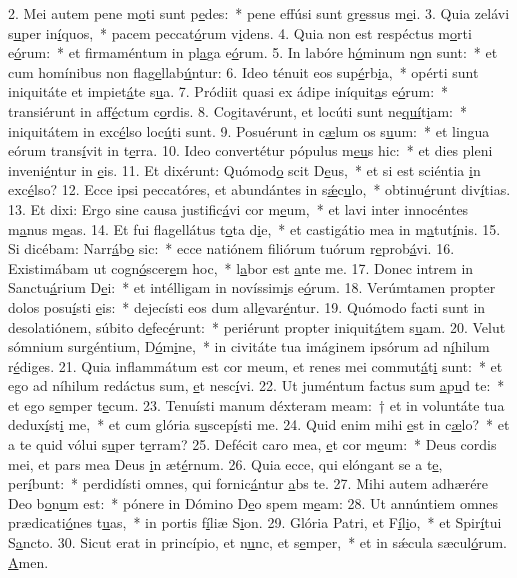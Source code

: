 2. Mei autem pene m\uline{o}ti sunt p\uline{e}des:~* pene effúsi sunt gr\uline{e}ssus m\uline{e}i.
3. Quia zelávi s\uline{u}per in\uline{í}quos,~* pacem peccat\uline{ó}rum v\uline{i}dens.
4. Quia non est respéctus m\uline{o}rti e\uline{ó}rum:~* et firmaméntum in pl\uline{a}ga e\uline{ó}rum.
5. In labóre h\uline{ó}minum n\uline{o}n sunt:~* et cum homínibus non flag\uline{e}llab\uline{ú}ntur:
6. Ideo ténuit eos sup\uline{é}rb\uline{i}a,~* opérti sunt iniquitáte et impiet\uline{á}te s\uline{u}a.
7. Pródiit quasi ex ádipe iníquit\uline{a}s e\uline{ó}rum:~* transiérunt in aff\uline{é}ctum c\uline{o}rdis.
8. Cogitavérunt, et locúti sunt ne\uline{quí}t\uline{i}am:~* iniquitátem in exc\uline{é}lso loc\uline{ú}ti sunt.
9. Posuérunt in c\uline{æ}lum os s\uline{u}um:~* et lingua eórum trans\uline{í}vit in t\uline{e}rra.
10. Ideo convertétur pópulus m\uline{e}\uline{u}s hic:~* et dies pleni inveni\uline{é}ntur in \uline{e}is.
11. Et dixérunt: Quómod\uline{o} scit D\uline{e}us,~* et si est sciéntia \uline{i}n exc\uline{é}lso?
12. Ecce ipsi peccatóres, et abundántes in s\uline{ǽ}c\uline{u}lo,~* obtinu\uline{é}runt div\uline{í}tias.
13. Et dixi: Ergo sine causa justific\uline{á}vi cor m\uline{e}um,~* et lavi inter innocéntes m\uline{a}nus m\uline{e}as.
14. Et fui flagellátus t\uline{o}ta d\uline{i}e,~* et castigátio mea in m\uline{a}tut\uline{í}nis.
15. Si dicébam: Narr\uline{á}b\uline{o} sic:~* ecce natiónem filiórum tuórum r\uline{e}prob\uline{á}vi.
16. Existimábam ut cogn\uline{ó}scer\uline{e}m hoc,~* l\uline{a}bor est \uline{a}nte me.
17. Donec intrem in Sanctu\uline{á}rium D\uline{e}i:~* et intélligam in novíssim\uline{i}s e\uline{ó}rum.
18. Verúmtamen propter dolos posu\uline{í}sti \uline{e}is:~* dejecísti eos dum all\uline{e}var\uline{é}ntur.
19. Quómodo facti sunt in desolatiónem, súbito d\uline{e}fec\uline{é}runt:~* periérunt propter iniquit\uline{á}tem s\uline{u}am.
20. Velut sómnium surgéntium, D\uline{ó}m\uline{i}ne,~* in civitáte tua imáginem ipsórum ad n\uline{í}hilum r\uline{é}diges.
21. Quia inflammátum est cor meum, et renes mei commut\uline{á}t\uline{i} sunt:~* et ego ad níhilum redáctus sum, \uline{e}t nesc\uline{í}vi.
22. Ut juméntum factus sum \uline{a}p\uline{u}d te:~* et ego s\uline{e}mper t\uline{e}cum.
23. Tenuísti manum déxteram meam:~† et in voluntáte tua dedux\uline{í}st\uline{i} me,~* et cum glória s\uline{u}scep\uline{í}sti me.
24. Quid enim mihi \uline{e}st in c\uline{æ}lo?~* et a te quid vólui s\uline{u}per t\uline{e}rram?
25. Defécit caro mea, \uline{e}t cor m\uline{e}um:~* Deus cordis mei, et pars mea Deus \uline{i}n æt\uline{é}rnum.
26. Quia ecce, qui elóngant se a t\uline{e}, per\uline{í}bunt:~* perdidísti omnes, qui fornic\uline{á}ntur \uline{a}bs te.
27. Mihi autem adhærére Deo b\uline{o}n\uline{u}m est:~* pónere in Dómino D\uline{e}o spem m\uline{e}am:
28. Ut annúntiem omnes prædicati\uline{ó}nes t\uline{u}as,~* in portis f\uline{í}liæ S\uline{i}on.
29. Glória Patri, et F\uline{í}l\uline{i}o,~* et Spir\uline{í}tui S\uline{a}ncto.
30. Sicut erat in princípio, et n\uline{u}nc, et s\uline{e}mper,~* et in sǽcula sæcul\uline{ó}rum. \uline{A}men.
